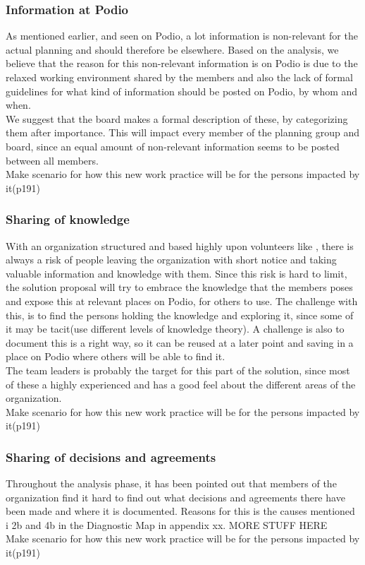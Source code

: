 \subsubsection{Information at Podio}
As mentioned earlier, and seen on Podio, a lot information is non-relevant for the actual planning and should therefore be elsewhere. Based on the analysis, we believe that the reason for this non-relevant information is on Podio is due to the relaxed working environment shared by the members and also the lack of formal guidelines for what kind of information should be posted on Podio, by whom and when.\\ 
We suggest that the board makes a formal description of these, by categorizing them after importance.
This will impact every member of the planning group and board, since an equal amount of non-relevant information seems to be posted between all members. \\

Make scenario for how this new work practice will be for the persons impacted by it(p191)
  
\subsubsection{Sharing of knowledge}
With an organization structured and based highly upon volunteers like \mil, there is always a risk of people leaving the organization with short notice and taking valuable information and knowledge with them. Since this risk is hard to limit, the solution proposal will try to embrace the knowledge that the members poses and expose this at relevant places on Podio, for others to use. The challenge with this, is to find the persons holding the knowledge and exploring it, since some of it may be tacit(use different levels of knowledge theory). A challenge is also to document this is a right way, so it can be reused at a later point and saving in a place on Podio where others will be able to find it.\\
The team leaders is probably the target for this part of the solution, since most of these a highly experienced and has a good feel about the different areas of the organization.\\

Make scenario for how this new work practice will be for the persons impacted by it(p191)

\subsubsection{Sharing of decisions and agreements}
Throughout the analysis phase, it has been pointed out that members of the organization find it hard to find out what decisions and agreements there have been made and where it is documented. Reasons for this is the causes mentioned i 2b and 4b in the Diagnostic Map in appendix xx. MORE STUFF HERE\\ 
Make scenario for how this new work practice will be for the persons impacted by it(p191)

